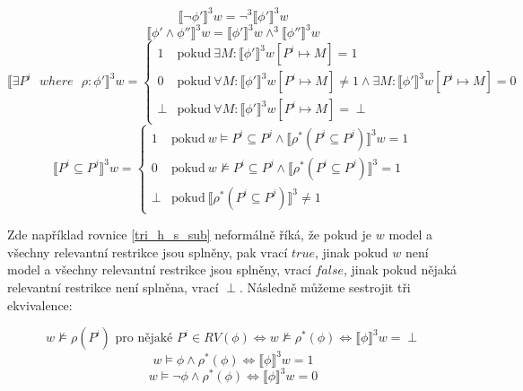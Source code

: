 \begin{equation}
    \llbracket \neg \phi' \rrbracket^{3}w = \neg^3 \llbracket \phi' \rrbracket^{3}w
\end{equation}
\begin{equation}
    \llbracket \phi' \wedge \phi'' \rrbracket^{3}w = \llbracket \phi' \rrbracket^{3}w \wedge^3 \llbracket \phi'' \rrbracket^{3}w
\end{equation}
\begin{equation}
    \llbracket \exists P^i \text{ } where \text{ } \rho: \phi' \rrbracket^{3}w = 
    \begin{cases}
        1 & \text{pokud}\ \exists M: \llbracket \phi' \rrbracket^{3} w[P^i \mapsto M]=1 \\
        0 & \text{pokud}\ \forall M: \llbracket \phi' \rrbracket^{3} w[P^i \mapsto M] \neq 1 \wedge \exists M: \llbracket \phi' \rrbracket^{3} w[P^i \mapsto M]=0 \\
        \perp & \text{pokud}\ \forall M: \llbracket \phi' \rrbracket^{3} w[P^i \mapsto M]= \perp
    \end{cases}
\end{equation}
\begin{equation}
    \label{tri_h_s_sub}
    \llbracket P^i \subseteq P^j \rrbracket^{3}w=
    \begin{cases}
        1 & \text{pokud}\ w \vDash P^i \subseteq P^j \wedge \llbracket \rho^* (P^i \subseteq P^j) \rrbracket^{3}w=1  \\
        0 & \text{pokud}\ w \nvDash P^i \subseteq P^j \wedge \llbracket \rho^* (P^i \subseteq P^j) \rrbracket^{3}=1 \\
        \perp & \text{pokud}\ \llbracket \rho^* (P^i \subseteq P^j) \rrbracket^{3} \neq 1
    \end{cases}
\end{equation}

Zde například rovnice \ref{tri_h_s_sub} neformálně říká, že pokud je $w$ model a všechny relevantní restrikce jsou splněny, pak vrací $true$, jinak pokud $w$ není model a všechny relevantní restrikce jsou splněny, vrací $false$, jinak pokud nějaká relevantní restrikce není splněna, vrací $\perp$. Následně můžeme sestrojit tři ekvivalence:

\begin{equation}
    \label{tri_h_s_final1}
    w \nvDash \rho (P^i) \text{ pro nějaké } P^i \in RV(\phi) \Leftrightarrow w \nvDash \rho^* (\phi) \Leftrightarrow \llbracket \phi \rrbracket^3w = \perp
\end{equation}
\begin{equation}
    \label{tri_h_s_final2}
    w \vDash \phi \wedge \rho^* (\phi) \Leftrightarrow \llbracket \phi \rrbracket^3w = 1
\end{equation}
\begin{equation}
    \label{tri_h_s_final3}
    w \vDash \neg \phi \wedge \rho^* (\phi) \Leftrightarrow \llbracket \phi \rrbracket^3w = 0
\end{equation}

